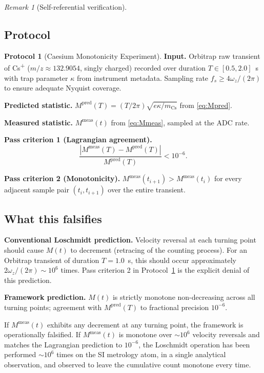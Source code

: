 \documentclass[twocolumn,10pt,a4paper]{article}
\theoremstyle{thmstyle}
\theoremstyle{definition}
\newtheorem{protocol}[theorem]{Protocol}
\theoremstyle{remark}
\newtheorem{remark}[theorem]{Remark}
\begin{document}
\begin{remark}[Self-referential verification]
\subsection{Protocol}

\begin{protocol}[Caesium Monotonicity Experiment]
\label{prot:C1}
\textbf{Input.} Orbitrap raw transient of Cs\textsuperscript{+}
($m/z\approx 132.9054$, singly charged) recorded over duration
$T\in[0.5,2.0]$~s with trap parameter $\kappa$ from instrument
metadata. Sampling rate $f_{s}\geq 4\omega_{z}/(2\pi)$ to ensure
adequate Nyquist coverage.

\textbf{Predicted statistic.}
$M^{\mathrm{pred}}(T)=(T/2\pi)\sqrt{e\kappa/m_{\mathrm{Cs}}}$ from
\eqref{eq:Mpred}.

\textbf{Measured statistic.} $M^{\mathrm{meas}}(t)$ from
\eqref{eq:Mmeas}, sampled at the ADC rate.

\textbf{Pass criterion 1 (Lagrangian agreement).}
\[
\frac{|M^{\mathrm{meas}}(T)-M^{\mathrm{pred}}(T)|}{M^{\mathrm{pred}}(T)}<10^{-6}.
\]

\textbf{Pass criterion 2 (Monotonicity).}
$M^{\mathrm{meas}}(t_{i+1})>M^{\mathrm{meas}}(t_{i})$ for every
adjacent sample pair $(t_{i},t_{i+1})$ over the entire transient.
\end{protocol}

\subsection{What this falsifies}

\textbf{Conventional Loschmidt prediction.} Velocity reversal at each
turning point should cause $M(t)$ to decrement (retracing of the
counting process). For an Orbitrap transient of duration
$T=1.0$~s, this should occur approximately
$2\omega_{z}/(2\pi)\sim 10^{6}$ times. Pass criterion 2 in
Protocol~\ref{prot:C1} is the explicit denial of this prediction.

\textbf{Framework prediction.} $M(t)$ is strictly monotone
non-decreasing across all turning points; agreement with
$M^{\mathrm{pred}}(T)$ to fractional precision $10^{-6}$.

If $M^{\mathrm{meas}}(t)$ exhibits any decrement at any turning point,
the framework is operationally falsified. If $M^{\mathrm{meas}}(t)$ is
monotone over $\sim 10^{6}$ velocity reversals and matches the
Lagrangian prediction to $10^{-6}$, the Loschmidt operation has been
performed $\sim 10^{6}$ times on the SI metrology atom, in a single
analytical observation, and observed to leave the cumulative count
monotone every time.


\end{remark}
\end{document}
